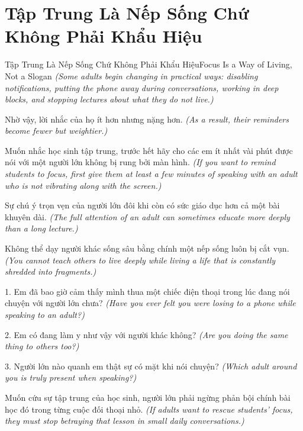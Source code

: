 \section{Tập Trung Là Nếp Sống Chứ Không Phải Khẩu Hiệu}
\begin{truyen}{Tập Trung Là Nếp Sống Chứ Không Phải Khẩu Hiệu}{Focus Is a Way of Living, Not a Slogan}
\textit{(Some adults begin changing in practical ways: disabling notifications, putting the phone away during conversations, working in deep blocks, and stopping lectures about what they do not live.)}

Nhờ vậy, lời nhắc của họ ít hơn nhưng nặng hơn.
\textit{(As a result, their reminders become fewer but weightier.)}

\end{truyen}

\begin{goigiaovien}
Muốn nhắc học sinh tập trung, trước hết hãy cho các em ít nhất vài phút được nói với một người lớn không bị rung bởi màn hình.
\textit{(If you want to remind students to focus, first give them at least a few minutes of speaking with an adult who is not vibrating along with the screen.)}

Sự chú ý trọn vẹn của người lớn đôi khi còn có sức giáo dục hơn cả một bài khuyên dài.
\textit{(The full attention of an adult can sometimes educate more deeply than a long lecture.)}
\end{goigiaovien}

\begin{baihoc}
Không thể dạy người khác sống sâu bằng chính một nếp sống luôn bị cắt vụn.
\textit{(You cannot teach others to live deeply while living a life that is constantly shredded into fragments.)}
\end{baihoc}

\begin{tuhocnhanh}
1. Em đã bao giờ cảm thấy mình thua một chiếc điện thoại trong lúc đang nói chuyện với người lớn chưa? \textit{(Have you ever felt you were losing to a phone while speaking to an adult?)}

2. Em có đang làm y như vậy với người khác không? \textit{(Are you doing the same thing to others too?)}

3. Người lớn nào quanh em thật sự có mặt khi nói chuyện? \textit{(Which adult around you is truly present when speaking?)}
\end{tuhocnhanh}

\begin{tongketchuong}
Muốn cứu sự tập trung của học sinh, người lớn phải ngừng phản bội chính bài học đó trong từng cuộc đối thoại nhỏ.
\textit{(If adults want to rescue students' focus, they must stop betraying that lesson in small daily conversations.)}
\end{tongketchuong}

\ngancach